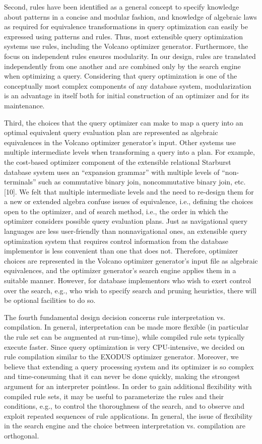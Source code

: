 \documentclass[a4paper,12pt,notitlepage,twoside,openright]{article}
\begin{document}
Second, rules have been identified as a general concept to specify
knowledge about patterns in a concise and modular fashion, and knowledge
of algebraic laws as required for equivalence transformations in query
optimization can easily be expressed using patterns and rules. Thus,
most extensible query optimization systems use rules, including the
Volcano optimizer generator. Furthermore, the focus on independent rules
ensures modularity. In our design, rules are translated independently
from one another and are combined only by the search engine when
optimizing a query. Considering that query optimization is one of the
conceptually most complex components of any database system,
modularization is an advantage in itself both for initial construction
of an optimizer and for its maintenance.

Third, the choices that the query optimizer can make to map a query into
an optimal equivalent query evaluation plan are represented as algebraic
equivalences in the Volcano optimizer generator's input. Other systems
use multiple intermediate levels when transforming a query into a plan.
For example, the cost-based optimizer component of the extensible
relational Starburst database system uses an ``expansion grammar'' with
multiple levels of ``non-terminals'' such as commutative binary join,
noncommutative binary join, etc. {[}10{]}. We felt that multiple
intermediate levels and the need to re-design them for a new or extended
algebra confuse issues of equivalence, i.e., defining the choices open
to the optimizer, and of search method, i.e., the order in which the
optimizer considers possible query evaluation plans. Just as
navigational query languages are less user-friendly than nonnavigational
ones, an extensible query optimization system that requires control
information from the database implementor is less convenient than one
that does not. Therefore, optimizer choices are represented in the
Volcano optimizer generator's input file as algebraic equivalences, and
the optimizer generator's search engine applies them in a suitable
manner. However, for database implementors who wish to exert control
over the search, e.g., who wish to specify search and pruning
heuristics, there will be optional facilities to do so.

The fourth fundamental design decision concerns rule interpretation vs.
compilation. In general, interpretation can be made more flexible (in
particular the rule set can be augmented at run-time), while compiled
rule sets typically execute faster. Since query optimization is very
CPU-intensive, we decided on rule compilation similar to the EXODUS
optimizer generator. Moreover, we believe that extending a query
processing system and its optimizer is so complex and time-consuming
that it can never be done quickly, making the strongest argument for an
interpreter pointless. In order to gain additional flexibility with
compiled rule sets, it may be useful to parameterize the rules and their
conditions, e.g., to control the thoroughness of the search, and to
observe and exploit repeated sequences of rule applications. In general,
the issue of flexibility in the search engine and the choice between
interpretation vs. compilation are orthogonal.
\end{document}
